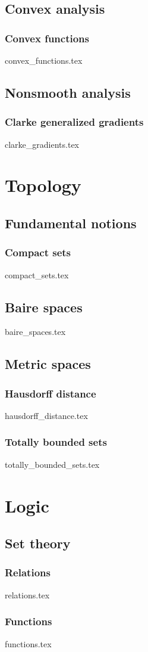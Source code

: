 \documentclass[numbers=endperiod, bibliography=totocnumbered]{scrartcl}
\begin{document}
\subsection{Convex analysis}\label{sec:convex_analysis}
\subsubsection{Convex functions}\label{sec:convex_functions}
{convex_functions.tex}

\subsection{Nonsmooth analysis}\label{sec:nonsmooth_analysis}
\subsubsection{Clarke generalized gradients}\label{sec:clarke_gradients}
{clarke_gradients.tex}

\section{Topology}\label{sec:topology}
\subsection{Fundamental notions}\label{sec:topology/fundamental_notions}
\subsubsection{Compact sets}\label{sec:compact_sets}
{compact_sets.tex}
\subsection{Baire spaces}\label{sec:baire_spaces}
{baire_spaces.tex}
\subsection{Metric spaces}\label{sec:metric_spaces}
\subsubsection{Hausdorff distance}\label{sec:hausdorff_distance}
{hausdorff_distance.tex}
\subsubsection{Totally bounded sets}\label{sec:totally_bounded_sets}
{totally_bounded_sets.tex}

\section{Logic}\label{sec:logic}
\subsection{Set theory}\label{sec:sets}
\subsubsection{Relations}\label{sec:relations}
{relations.tex}
\subsubsection{Functions}\label{sec:functions}
{functions.tex}

\printbibliography
\end{document}
